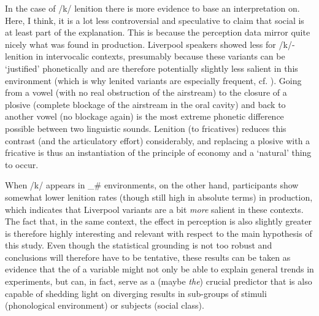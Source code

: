 In the case of /k/ lenition there is more evidence to base an interpretation on.
Here, I think, it is a lot less controversial and speculative to claim that social  is at least part of the explanation.
This is because the perception data mirror quite nicely what was found in production.
Liverpool speakers showed less  for /k/-lenition in intervocalic contexts, presumably because these variants can be `justified' phonetically and are therefore potentially slightly less salient in this environment (which is why lenited variants are especially frequent, cf. ).
Going from a vowel (with no real obstruction of the airstream) to the closure of a plosive (complete blockage of the airstream in the oral cavity) and back to another vowel (no blockage again) is the most extreme phonetic difference possible between two linguistic sounds.
Lenition (to fricatives) reduces this contrast (and the articulatory effort) considerably, and replacing a plosive with a fricative is thus an instantiation of the principle of economy and a `natural' thing to occur.

When /k/ appears in \_\# environments, on the other hand, participants show somewhat lower lenition rates (though still high in absolute terms) in production, which indicates that Liverpool variants are a bit \emph{more} salient in these contexts.
The fact that, in the same context, the  effect in perception is also slightly greater is therefore highly interesting and relevant with respect to the main hypothesis of this study.
Even though the statistical grounding is not too robust and conclusions will therefore have to be tentative, these results can be taken as evidence that the  of a variable might not only be able to explain general trends in   experiments, but can, in fact, serve as a (maybe \emph{the}) crucial predictor that is also capable of shedding light on diverging results in sub-groups of stimuli (phonological environment) or subjects (social class).

